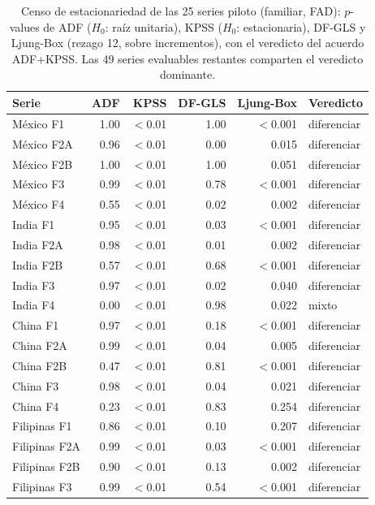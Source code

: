 \documentclass[12pt,letterpaper]{report}
\begin{document}
\begin{table}[H]
\centering
\footnotesize
\caption[Censo de estacionariedad del piloto]{Censo de estacionariedad de las 25 series
piloto (familiar, FAD): $p$-values de ADF ($H_0$: raíz unitaria), KPSS ($H_0$:
estacionaria), DF-GLS y Ljung-Box (rezago 12, sobre incrementos), con el veredicto del
acuerdo ADF+KPSS. Las 49 series evaluables restantes comparten el veredicto dominante.}
\label{tab:eda_estacionariedad}
\begin{tabular}{lrrrrl}
\toprule
\rowcolor{uacjblue!15}
\textbf{Serie} & \textbf{ADF} & \textbf{KPSS} & \textbf{DF-GLS} & \textbf{Ljung-Box} &
\textbf{Veredicto} \\
\midrule
México F1 & 1.00 & $<$0.01 & 1.00 & $<$0.001 & diferenciar \\
México F2A & 0.96 & $<$0.01 & 0.00 & 0.015 & diferenciar \\
México F2B & 1.00 & $<$0.01 & 1.00 & 0.051 & diferenciar \\
México F3 & 0.99 & $<$0.01 & 0.78 & $<$0.001 & diferenciar \\
México F4 & 0.55 & $<$0.01 & 0.02 & 0.002 & diferenciar \\
India F1 & 0.95 & $<$0.01 & 0.03 & $<$0.001 & diferenciar \\
India F2A & 0.98 & $<$0.01 & 0.01 & 0.002 & diferenciar \\
India F2B & 0.57 & $<$0.01 & 0.68 & $<$0.001 & diferenciar \\
India F3 & 0.97 & $<$0.01 & 0.02 & 0.040 & diferenciar \\
India F4 & 0.00 & $<$0.01 & 0.98 & 0.022 & mixto \\
China F1 & 0.97 & $<$0.01 & 0.18 & $<$0.001 & diferenciar \\
China F2A & 0.99 & $<$0.01 & 0.04 & 0.005 & diferenciar \\
China F2B & 0.47 & $<$0.01 & 0.81 & $<$0.001 & diferenciar \\
China F3 & 0.98 & $<$0.01 & 0.04 & 0.021 & diferenciar \\
China F4 & 0.23 & $<$0.01 & 0.83 & 0.254 & diferenciar \\
Filipinas F1 & 0.86 & $<$0.01 & 0.10 & 0.207 & diferenciar \\
Filipinas F2A & 0.99 & $<$0.01 & 0.03 & $<$0.001 & diferenciar \\
Filipinas F2B & 0.90 & $<$0.01 & 0.13 & 0.002 & diferenciar \\
Filipinas F3 & 0.99 & $<$0.01 & 0.54 & $<$0.001 & diferenciar \\

\end{tabular}
\end{table}
\end{document}
